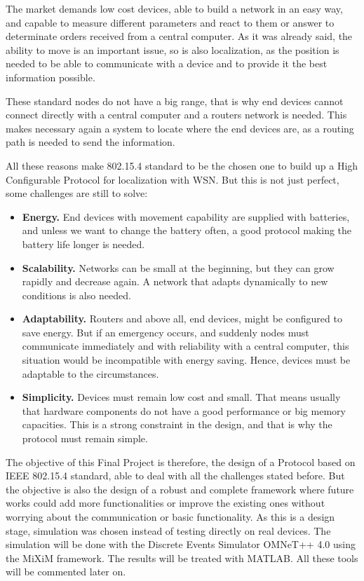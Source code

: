 The market demands low cost devices, able to build a network in an easy way, and capable to measure different parameters and react to them
or answer to determinate orders received from a central computer. As it was already said, the ability to move is an important issue, so is 
also localization, as the position is needed to be able to communicate with a device and to provide it the best information possible.

These standard nodes do not have a big range, that is why end devices cannot connect directly with a central computer and a routers network 
is needed. This makes necessary again a system to locate where the end devices are, as a routing path is needed to send the information.

All these reasons make 802.15.4 standard to be the chosen one to build up a High Configurable Protocol for localization with \ac{WSN}. 
But this is not just perfect, some challenges are still to solve:

\begin{itemize}
 \item \textbf{Energy.} End devices with movement capability are supplied with batteries, and unless we want to change the battery often,
a good protocol making the battery life longer is needed.
 \item \textbf{Scalability.} Networks can be small at the beginning, but they can grow rapidly and decrease again. A network that adapts 
dynamically to new conditions is also needed.
 \item \textbf{Adaptability.} Routers and above all, end devices, might be configured to save energy. But if an emergency occurs, and suddenly
nodes must communicate immediately and with reliability with a central computer, this situation would be incompatible with energy saving. 
Hence, devices must be adaptable to the circumstances.
 \item \textbf{Simplicity.} Devices must remain low cost and small. That means usually that hardware components do not have a good performance
or big memory capacities. This is a strong constraint in the design, and that is why the protocol must remain simple.
\end{itemize}

The objective of this Final Project is therefore, the design of a Protocol based on \ac{IEEE} 802.15.4 standard, able to deal with all the 
challenges stated before. But the objective is also the design of a robust and complete framework where future works could add more 
functionalities or improve the existing ones without worrying about the communication or basic functionality.
As this is a design stage, simulation was chosen instead of testing directly on real devices. The simulation will be done with the Discrete 
Events Simulator \ac{OMNeT++} 4.0 using the \ac{MiXiM} framework. The results will be treated with \ac{MATLAB}. All these tools will be 
commented later on.

